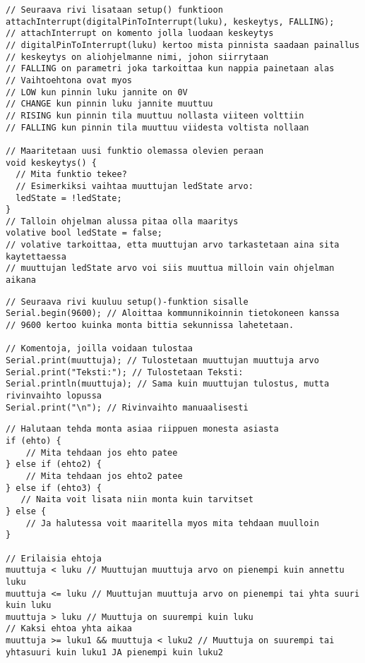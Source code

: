\begin{tcolorbox}[colback=white,title=Vinkkejä Arduinolla koodaamiseen!,colbacktitle=purple!90, breakable]
\begin{lstlisting}
// Seuraava rivi lisataan setup() funktioon
attachInterrupt(digitalPinToInterrupt(luku), keskeytys, FALLING);
// attachInterrupt on komento jolla luodaan keskeytys
// digitalPinToInterrupt(luku) kertoo mista pinnista saadaan painallus
// keskeytys on aliohjelmanne nimi, johon siirrytaan
// FALLING on parametri joka tarkoittaa kun nappia painetaan alas
// Vaihtoehtona ovat myos
// LOW kun pinnin luku jannite on 0V
// CHANGE kun pinnin luku jannite muuttuu
// RISING kun pinnin tila muuttuu nollasta viiteen volttiin
// FALLING kun pinnin tila muuttuu viidesta voltista nollaan

// Maaritetaan uusi funktio olemassa olevien peraan
void keskeytys() {
  // Mita funktio tekee?
  // Esimerkiksi vaihtaa muuttujan ledState arvo:
  ledState = !ledState;
}
// Talloin ohjelman alussa pitaa olla maaritys
volative bool ledState = false;
// volative tarkoittaa, etta muuttujan arvo tarkastetaan aina sita kaytettaessa
// muuttujan ledState arvo voi siis muuttua milloin vain ohjelman aikana
\end{lstlisting}
\end{tcolorbox}

\begin{tcolorbox}[colback=white,title=Vinkkejä Arduinolla koodaamiseen!,colbacktitle=purple!90, breakable]
\begin{lstlisting}
// Seuraava rivi kuuluu setup()-funktion sisalle
Serial.begin(9600); // Aloittaa kommunnikoinnin tietokoneen kanssa
// 9600 kertoo kuinka monta bittia sekunnissa lahetetaan.

// Komentoja, joilla voidaan tulostaa
Serial.print(muuttuja); // Tulostetaan muuttujan muuttuja arvo
Serial.print("Teksti:"); // Tulostetaan Teksti: 
Serial.println(muuttuja); // Sama kuin muuttujan tulostus, mutta rivinvaihto lopussa
Serial.print("\n"); // Rivinvaihto manuaalisesti
\end{lstlisting}
\end{tcolorbox}

\begin{tcolorbox}[colback=white,title=Vinkkejä Arduinolla koodaamiseen!,colbacktitle=purple!90, breakable]
\begin{lstlisting}
// Halutaan tehda monta asiaa riippuen monesta asiasta
if (ehto) {
    // Mita tehdaan jos ehto patee
} else if (ehto2) {
    // Mita tehdaan jos ehto2 patee
} else if (ehto3) {
   // Naita voit lisata niin monta kuin tarvitset
} else {
    // Ja halutessa voit maaritella myos mita tehdaan muulloin
}

// Erilaisia ehtoja
muuttuja < luku // Muuttujan muuttuja arvo on pienempi kuin annettu luku
muuttuja <= luku // Muuttujan muuttuja arvo on pienempi tai yhta suuri kuin luku
muuttuja > luku // Muuttuja on suurempi kuin luku
// Kaksi ehtoa yhta aikaa
muuttuja >= luku1 && muuttuja < luku2 // Muuttuja on suurempi tai yhtasuuri kuin luku1 JA pienempi kuin luku2
\end{lstlisting}
\end{tcolorbox}

